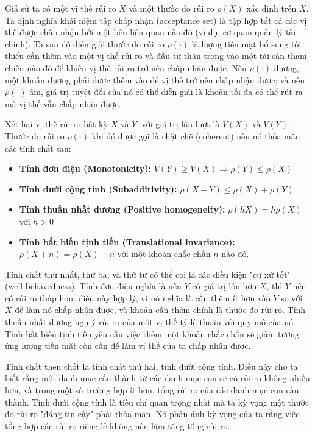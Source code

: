 Giả sử ta có một vị thế rủi ro $X$ và một thước đo rủi ro $\rho(X)$ xác định trên $X$. Ta định nghĩa khái niệm tập chấp nhận (acceptance set) là tập hợp tất cả các vị thế được chấp nhận bởi một bên liên quan nào đó (ví dụ, cơ quan quản lý tài chính). Ta sau đó diễn giải thước đo rủi ro $\rho(\cdot)$ là lượng tiền mặt bổ sung tối thiểu cần thêm vào một vị thế rủi ro và đầu tư thận trọng vào một tài sản tham chiếu nào đó để khiến vị thế rủi ro trở nên chấp nhận được. Nếu $\rho(\cdot)$ dương, một khoản dương phải được thêm vào để vị thế trở nên chấp nhận được; và nếu $\rho(\cdot)$ âm, giá trị tuyệt đối của nó có thể diễn giải là khoản tối đa có thể rút ra mà vị thế vẫn chấp nhận được.

Xét hai vị thế rủi ro bất kỳ $X$ và $Y$, với giá trị lần lượt là $V(X)$ và $V(Y)$. Thước đo rủi ro $\rho(\cdot)$ khi đó được gọi là chặt chẽ (coherent) nếu nó thỏa mãn các tính chất sau:

\begin{itemize}
  \item \textbf{Tính đơn điệu (Monotonicity):} $V(Y) \geq V(X) \Rightarrow \rho(Y) \leq \rho(X)$
  \item \textbf{Tính dưới cộng tính (Subadditivity):} $\rho(X + Y) \leq \rho(X) + \rho(Y)$
  \item \textbf{Tính thuần nhất dương (Positive homogeneity):} $\rho(hX) = h\rho(X)$ với $h > 0$
  \item \textbf{Tính bất biến tịnh tiến (Translational invariance):} $\rho(X + n) = \rho(X) - n$ với một khoản chắc chắn $n$ nào đó.
\end{itemize}

Tính chất thứ nhất, thứ ba, và thứ tư có thể coi là các điều kiện "cư xử tốt" (well-behavedness). Tính đơn điệu nghĩa là nếu $Y$ có giá trị lớn hơn $X$, thì $Y$ nên có rủi ro thấp hơn: điều này hợp lý, vì nó nghĩa là cần thêm ít hơn vào $Y$ so với $X$ để làm nó chấp nhận được, và khoản cần thêm chính là thước đo rủi ro. Tính thuần nhất dương ngụ ý rủi ro của một vị thế tỷ lệ thuận với quy mô của nó. Tính bất biến tịnh tiến yêu cầu việc thêm một khoản chắc chắn sẽ giảm tương ứng lượng tiền mặt còn cần để làm vị thế của ta chấp nhận được.

Tính chất then chốt là tính chất thứ hai, tính dưới cộng tính. Điều này cho ta biết rằng một danh mục cấu thành từ các danh mục con sẽ có rủi ro không nhiều hơn, và trong một số trường hợp ít hơn, tổng rủi ro của các danh mục con cấu thành. Tính dưới cộng tính là tiêu chí quan trọng nhất mà ta kỳ vọng một thước đo rủi ro "đáng tin cậy" phải thỏa mãn. Nó phản ánh kỳ vọng của ta rằng việc tổng hợp các rủi ro riêng lẻ không nên làm tăng tổng rủi ro.

